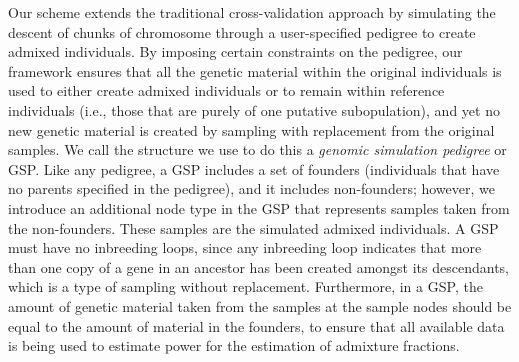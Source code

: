 Our scheme extends the traditional cross-validation approach
by simulating the descent of chunks of chromosome through a user-specified
pedigree to create admixed individuals.  By imposing certain constraints
on the pedigree, our framework ensures that all the genetic material
within the original individuals is used to either create admixed individuals or to
remain within reference individuals (i.e., those that are purely of one
putative subopulation), and yet no new genetic material is
created by sampling with replacement from the original samples.  We call the structure
we use to do this a {\em genomic simulation pedigree} or GSP.  Like any pedigree,
a GSP includes a set of founders (individuals that have no parents specified in the
pedigree), and it includes non-founders; however, we introduce an additional node
type in the GSP that represents samples taken from the non-founders. These samples
are the simulated admixed individuals.  A GSP must have no inbreeding loops, since
any inbreeding loop indicates that more than one copy of a gene in an ancestor has
been created amongst its descendants, which is a type of sampling without
replacement.  Furthermore, in a GSP, the amount of genetic material taken from the
samples at the sample nodes should be equal to the amount of material in the founders,
to ensure that all available data is being used to estimate power for the estimation of
admixture fractions.


